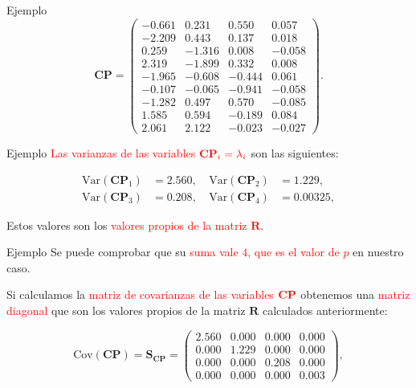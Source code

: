 \documentclass[
  ignorenonframetext,
]{beamer}
\newcommand\red[1]{\textcolor{red}{#1}}
\begin{document}
\begin{frame}{Ejemplo}
\protect\hypertarget{ejemplo-22}{}
\[
\mathbf{CP}=
\begin{pmatrix}
-0.661 & 0.231 & 0.550 & 0.057 \\
 -2.209 & 0.443 & 0.137 & 0.018 \\
 0.259 & -1.316 & 0.008 & -0.058 \\
 2.319 & -1.899 & 0.332 & 0.008 \\
 -1.965 & -0.608 & -0.444 & 0.061 \\
 -0.107 & -0.065 & -0.941 & -0.058 \\
 -1.282 & 0.497 & 0.570 & -0.085 \\
 1.585 & 0.594 & -0.189 & 0.084 \\
 2.061 & 2.122 & -0.023 & -0.027 
\end{pmatrix}.
\]
\end{frame}

\begin{frame}{Ejemplo}
\protect\hypertarget{ejemplo-23}{}
\red{Las varianzas de las variables}
\(\textcolor{red}{\mathbf{CP}_i=\lambda_{i}}\) son las siguientes:

\[
\begin{array}{llcll}
\mbox{Var}(\mathbf{CP}_1) & =2.560,\ & \mbox{Var}(\mathbf{CP}_2) & =1.229,\\
\mbox{Var}(\mathbf{CP}_3) & =0.208,\ & \mbox{Var}(\mathbf{CP}_4) & =0.00325,
\end{array}
\]

Estos valores son los
\textcolor{red}{valores propios de la matriz $\mathbf{R}$}.
\end{frame}

\begin{frame}{Ejemplo}
\protect\hypertarget{ejemplo-24}{}
Se puede comprobar que su
\textcolor{red}{suma vale $4$, que es el valor de $p$} en nuestro caso.

Si calculamos la \textcolor{red}{matriz de covarianzas de las variables}
\(\textcolor{red}{\mathbf{CP}}\) obtenemos una
\textcolor{red}{matriz diagonal} que son los valores propios de la
matriz \(\mathbf{R}\) calculados anteriormente:

\[
\mbox{Cov}(\mathbf{CP})= \mathbf{S}_{\mathbf{CP}} = 
\begin{pmatrix}
2.560 & 0.000 & 0.000 & 0.000 \\
 0.000 & 1.229 & 0.000 & 0.000 \\
 0.000 & 0.000 & 0.208 & 0.000 \\
 0.000 & 0.000 & 0.000 & 0.003 
\end{pmatrix},
\]
\end{frame}
\end{document}
